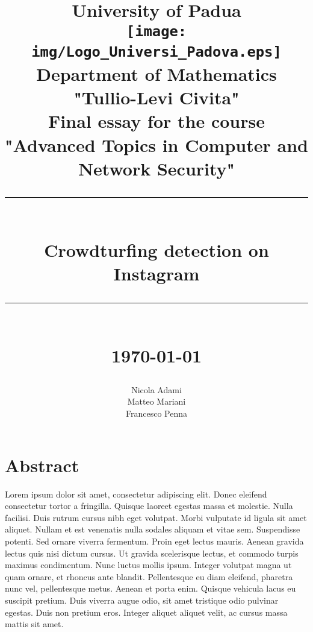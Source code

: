\documentclass[11pt]{report}
\newcommand{\HRule}[1]{\rule{\linewidth}{#1}}
\begin{document}
\date{}

\title{ \normalsize University of Padua
		\\ [1.0cm]
		\texttt{[image: img/Logo\_Universi\_Padova.eps]}\\[.5cm]
		Department of Mathematics "Tullio-Levi Civita"\\
        Final essay for the course "Advanced Topics in Computer and Network Security"
		\HRule{2pt} \\
		\LARGE \textbf{Crowdturfing detection on Instagram} %
		\HRule{2pt} \\ [0.5cm]
		\normalsize \today \vspace*{5\baselineskip}}
		
\date{}

\author{
		Nicola Adami  \\
		Matteo Mariani \\
        Francesco Penna}
		 
\maketitle


\section*{Abstract}

 Lorem ipsum dolor sit amet, consectetur adipiscing elit. Donec eleifend consectetur tortor a fringilla. Quisque laoreet egestas massa et molestie. Nulla facilisi. Duis rutrum cursus nibh eget volutpat. Morbi vulputate id ligula sit amet aliquet. Nullam et est venenatis nulla sodales aliquam et vitae sem. Suspendisse potenti. Sed ornare viverra fermentum. Proin eget lectus mauris. Aenean gravida lectus quis nisi dictum cursus. Ut gravida scelerisque lectus, et commodo turpis maximus condimentum. Nunc luctus mollis ipsum.
Integer volutpat magna ut quam ornare, et rhoncus ante blandit. Pellentesque eu diam eleifend, pharetra nunc vel, pellentesque metus. Aenean et porta enim. Quisque vehicula lacus eu suscipit pretium. Duis viverra augue odio, sit amet tristique odio pulvinar egestas. Duis non pretium eros. Integer aliquet aliquet velit, ac cursus massa mattis sit amet. 
\end{document}
